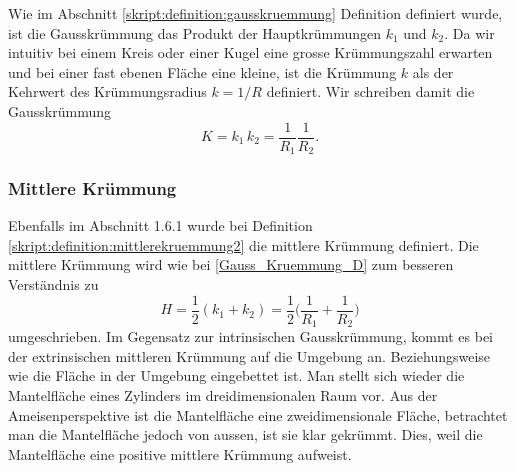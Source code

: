 \begin{refsection}
Wie im Abschnitt \ref{skript:definition:gausskruemmung} Definition definiert wurde, ist die Gausskrümmung das Produkt der Hauptkrümmungen $k_1$ und $k_2$. 
Da wir intuitiv bei einem Kreis oder einer Kugel eine grosse Krümmungszahl erwarten und bei einer fast ebenen Fläche eine kleine, ist die Krümmung $k$ als der Kehrwert des Krümmungsradius $k=1/R$ definiert.
Wir schreiben damit die Gausskrümmung
\begin{equation} \label{Gauss_Kruemmung_D}
 K=k_1\, k_2= \frac{1}{R_1}\frac{1}{R_2}.
\end{equation}

\subsubsection{Mittlere Krümmung} 


Ebenfalls im Abschnitt 1.6.1 wurde bei Definition \ref{skript:definition:mittlerekruemmung2} die mittlere Krümmung definiert. Die mittlere Krümmung wird wie bei \eqref{Gauss_Kruemmung_D} zum besseren Verständnis zu
\begin{equation} \label{Mittlere Kruemmung_D}
H=\frac{1}{2}(k_1+k_2)= \frac{1}{2}\bigg(\frac{1}{R_1}+\frac{1}{R_2}\bigg)
\end{equation}
umgeschrieben.
Im Gegensatz zur intrinsischen Gausskrümmung, kommt es bei der extrinsischen mittleren Krümmung auf die Umgebung an. Beziehungsweise wie die Fläche in der Umgebung eingebettet ist.
Man stellt sich wieder die Mantelfläche eines Zylinders im dreidimensionalen Raum vor.
Aus der Ameisenperspektive ist die Mantelfläche eine zweidimensionale Fläche, betrachtet man die Mantelfläche jedoch von aussen, ist sie klar gekrümmt.
Dies, weil die Mantelfläche eine positive mittlere Krümmung aufweist. 



\end{refsection}
